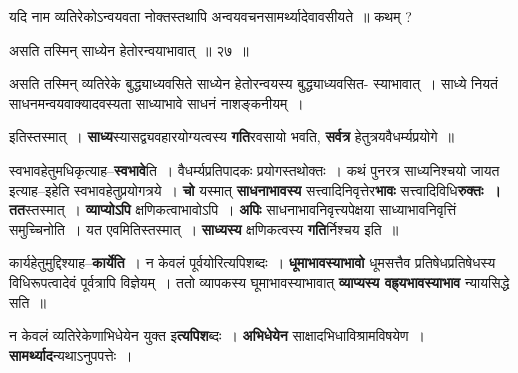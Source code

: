 \documentclass[article,12pt,a4paper]{memoir}
\begin{document}
	  \pstart यदि नाम व्यतिरेकोऽन्वयवता नोक्तस्तथापि अन्वयवचनसामर्थ्यादेवावसीयते ॥ कथम् ?
	\pend
        
	  \bigskip
	  \begingroup
	

	  \pstart असति तस्मिन् साध्येन हेतोरन्वयाभावात् ॥ २७ ॥
	\pend
      
	  \endgroup
	 

	  \pstart असति तस्मिन् व्यतिरेके बुद्ध्याध्यवसिते साध्येन हेतोरन्वयस्य बुद्ध्याध्यवसित- स्याभावात् । साध्ये नियतं साधनमन्वयवाक्यादवस्यता साध्याभावे साधनं नाशङ्कनीयम् ।
	\pend
      
	  \endgroup
	

	  \pstart इतिस्तस्मात् । \textbf{साध्य}स्यासद्व्यवहारयोग्यत्वस्य \textbf{गति}रवसायो भवति, \textbf{सर्वत्र} हेतुत्रयवैधर्म्यप्रयोगे ॥
	\pend
      

	  \pstart स्वभावहेतुमधिकृत्याह--\textbf{स्वभावे}ति । वैधर्म्यप्रतिपादकः प्रयोगस्तथोक्तः । कथं पुनरत्र साध्यनिश्चयो जायत इत्याह--इहेति स्वभावहेतुप्रयोगत्रये । \textbf{चो} यस्मात् \textbf{साधनाभावस्य} सत्त्वादिनिवृत्तेर\textbf{भावः} सत्त्वादिविधि\textbf{रुक्तः । तत}स्तस्मात् । \textbf{व्याप्योऽपि} क्षणिकत्वाभावोऽपि । \textbf{अपिः} साधनाभावनिवृत्त्यपेक्षया साध्याभावनिवृत्तिं समुच्चिनोति । यत एवमितिस्तस्मात् । \textbf{साध्यस्य} क्षणिकत्वस्य \textbf{गति}र्निश्चय इति ॥
	\pend
      

	  \pstart कार्यहेतुमुद्दिश्याह--\textbf{कार्येति} । न केवलं पूर्वयोरित्यपिशब्दः । \textbf{धूमाभावस्याभावो} धूमसत्तैव प्रतिषेधप्रतिषेधस्य विधिरूपत्वादेवं पूर्वत्रापि विज्ञेयम् । ततो व्यापकस्य घूमाभावस्याभावात् \textbf{व्याप्यस्य वह्र्यभावस्याभाव} न्यायसिद्धे सति ॥
	\pend
      

	  \pstart न केवलं व्यतिरेकेणाभिधेयेन युक्त इ\textbf{त्यपिश}ब्दः । \textbf{अभिधेयेन} साक्षादभिधाविश्रामविषयेण । \textbf{सामर्थ्याद}न्यथाऽनुपपत्तेः ।
	\pend
      
\end{document}
